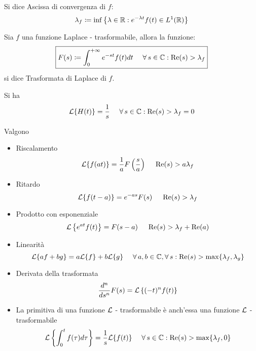 \begin{defn}
Si dice Ascissa di convergenza di $\displaystyle f$:
\begin{equation*}
\lambda_{f} \coloneqq \inf\left\{\lambda \in \mathbb{R}  :e^{- \lambda t} f(t) \in L^{1}(\mathbb{R})\right\}
\end{equation*}
\end{defn}
\begin{defn}
Sia $\displaystyle f$ una funzione Laplace - trasformabile, allora la funzione:
\begin{equation*}
\boxed{F(s) \coloneqq \int^{+ \infty}_{0} e^{- st} f(t) dt\ \ \ \ \forall s\in \CC  :\Re (s)  > \lambda_{f}}
\end{equation*}
si dice Trasformata di Laplace di $\displaystyle f$.
\end{defn}
\begin{rem}
 Si ha
\begin{equation*}
\Lc\{H(t)\} = \frac{1}{s} \ \ \ \ \forall s\in \CC  :\Re (s)  > \lambda_{f} = 0
\end{equation*}
\end{rem}
\begin{thm}
[Proprietà] Valgono
\begin{itemize}
\item Riscalamento
\begin{equation*}
\mathcal{L}\{f(at)\} = \frac{1}{a} F\left(\frac{s}{a}\right) \ \ \ \ \operatorname{Re} (s)  > a\lambda_{f}
\end{equation*}
\item Ritardo
\begin{equation*}
\mathcal{L}\{f(t - a)\} = e^{- as} F(s) \ \ \ \ \operatorname{Re} (s)  > \lambda_{f}
\end{equation*}
\item Prodotto con esponenziale
\begin{equation*}
\Lc\left\{e^{at} f(t)\right\} = F(s - a) \ \ \ \ \Re (s)  > \lambda_{f} + \Re (a)
\end{equation*}
\item Linearità
\begin{equation*}
\Lc\{af + bg\} = a\Lc\{f\} + b\Lc\{g\} \ \ \ \ \forall a, b\in \CC, \forall s:\Re (s)  > \max\{\lambda_{f}, \lambda_{g}\}
\end{equation*}
\item Derivata della trasformata
\begin{equation*}
\frac{d^{n}}{ds^{n}} F(s) = \mathcal{L}\left\{(- t)^{n} f(t)\right\}
\end{equation*}
\item La primitiva di una funzione $\mathcal{L}$ - trasformabile è anch'essa una funzione $\mathcal{L}$ - trasformabile
\begin{equation*}
\Lc\left\{\int^{t}_{0} f(\tau) d\tau \right\} = \frac{1}{s}\Lc\{f(t)\} \ \ \ \ \forall s\in \CC  :\Re (s)  > \max\{\lambda_{f}, 0\}
\end{equation*}
\end{itemize}
\end{thm}
